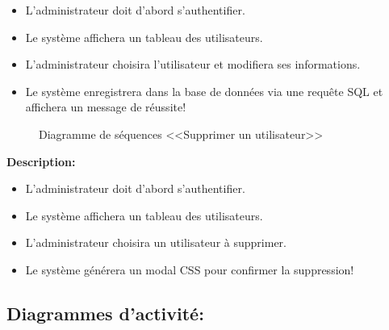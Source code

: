 \documentclass[12pt]{report}
\begin{document}
\begin{itemize}
    \item L'administrateur doit d'abord s'authentifier.
    \item Le système affichera un tableau des utilisateurs.
    \item L'administrateur choisira l'utilisateur et modifiera ses informations.
    \item Le système enregistrera dans la base de données via une requête SQL et affichera un message de réussite!
\end{itemize}

\newpage

\begin{figure}[h]
\centering
    \caption{Diagramme de séquences <<Supprimer un utilisateur>>}
\end{figure}

\vspace{0.3in}

\textbf{Description:}

\begin{itemize}
    \item L'administrateur doit d'abord s'authentifier.
    \item Le système affichera un tableau des utilisateurs.
    \item L'administrateur choisira un utilisateur à supprimer.
    \item Le système générera un modal CSS pour confirmer la suppression!
\end{itemize}

\newpage

\subsection{Diagrammes d'activité:}
\end{document}
